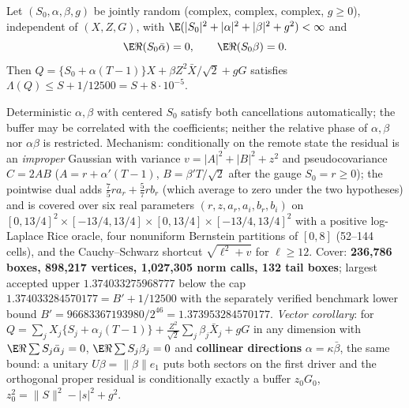 \begin{theorem}\label{thm:kjoint-complex}
Let $(S_0,\alpha,\beta,g)$ be jointly random (complex, complex, complex, $g\ge0$), independent of $(X,Z,G)$, with $\E(|S_0|^2+|\alpha|^2+|\beta|^2+g^2)<\infty$ and
\[
\E\Re(S_0\bar\alpha)=0,\qquad\E\Re(S_0\beta)=0 .
\]
Then $Q=\{S_0+\alpha(T-1)\}X+\beta Z^2\bar X/\sqrt2+gG$ satisfies $\Lambda(Q)\le S+1/12500=S+8\cdot10^{-5}$.
\end{theorem}
Deterministic $\alpha,\beta$ with centered $S_0$ satisfy both cancellations automatically; the buffer may be correlated with the coefficients; neither the relative phase of
$\alpha,\beta$ nor $\alpha\beta$ is restricted. Mechanism: conditionally on the remote state the residual is an \emph{improper} Gaussian with variance $v=|A|^2+|B|^2+z^2$ and
pseudocovariance $C=2AB$ ($A=r+\alpha'(T-1)$, $B=\beta'T/\sqrt2$ after the gauge $S_0=r\ge0$); the pointwise dual adds $\frac75ra_r+\frac57rb_r$ (which average to zero under the
two hypotheses) and is covered over six real parameters $(r,z,a_r,a_i,b_r,b_i)$ on $[0,13/4]^2\times[-13/4,13/4]\times[0,13/4]\times[-13/4,13/4]^2$ with a positive
log-Laplace Rice oracle, four nonuniform Bernstein partitions of $[0,8]$ (52--144 cells), and the Cauchy--Schwarz shortcut $\sqrt{\ell^2+v}$ for $\ell\ge12$. Cover:
\textbf{236,786 boxes, 898,217 vertices, 1,027,305 norm calls, 132 tail boxes}; largest accepted upper $1.374033275968777$ below the cap $1.374033284570177=B'+1/12500$
with the separately verified benchmark lower bound $B'=96683367193980/2^{46}=1.373953284570177$. \emph{Vector corollary}: for $Q=\sum_jX_j\{S_j+\alpha_j(T-1)\}+\frac{Z^2}{\sqrt2}\sum_j\beta_j\bar X_j+gG$
in any dimension with $\E\Re\sum S_j\bar\alpha_j=0$, $\E\Re\sum S_j\beta_j=0$ and \textbf{collinear directions} $\alpha=\kappa\bar\beta$, the same bound: a unitary $U\beta=\|\beta\|e_1$
puts both sectors on the first driver and the orthogonal proper residual is conditionally exactly a buffer $z_0G_0$, $z_0^2=\|S\|^2-|s|^2+g^2$.

